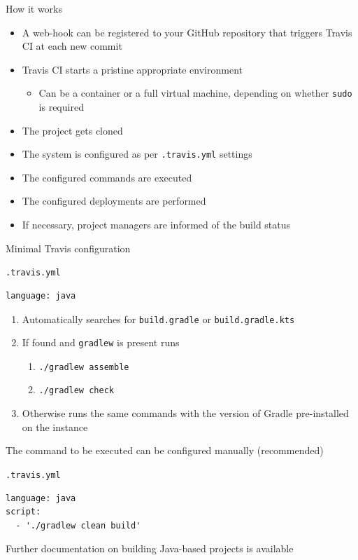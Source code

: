 \documentclass[presentation]{beamer}
\begin{document}
\begin{frame}[fragile]{How it works}
	\begin{itemize}
		\item A web-hook can be registered to your GitHub repository that triggers Travis CI at each new commit
		\item Travis CI starts a pristine appropriate environment
		\begin{itemize}
			\item Can be a container or a full virtual machine, depending on whether \texttt{sudo} is required \cite{travisbuild}
		\end{itemize}
		\item The project gets cloned
		\item The system is configured as per \texttt{.travis.yml} settings
		\item The configured commands are executed
		\item The configured deployments are performed
		\item If necessary, project managers are informed of the build status
	\end{itemize}
\end{frame}

\begin{frame}[fragile]{Minimal Travis configuration}
	\begin{block}{\texttt{.travis.yml}}
		\begin{verbatim}
language: java
		\end{verbatim}
	\end{block}
	\begin{enumerate}
		\item Automatically searches for \texttt{build.gradle} or \texttt{build.gradle.kts}
		\item If found and \texttt{gradlew} is present runs
		\begin{enumerate}
			\item \texttt{./gradlew assemble}
			\item \texttt{./gradlew check}
		\end{enumerate}
		\item Otherwise runs the same commands with the version of Gradle pre-installed on the instance
	\end{enumerate}
	The command to be executed can be configured manually (recommended)
	\begin{block}{\texttt{.travis.yml}}
		\begin{verbatim}
language: java
script:
  - './gradlew clean build'
		\end{verbatim}
	\end{block}
	Further documentation on building Java-based projects is available \cite{travisjava}
\end{frame}
\end{document}
